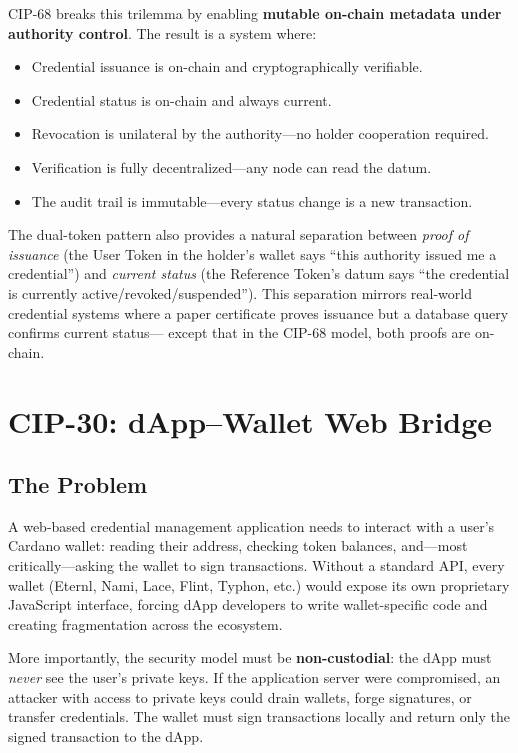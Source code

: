 CIP-68 breaks this trilemma by enabling \textbf{mutable on-chain metadata
under authority control}.  The result is a system where:

\begin{itemize}[nosep]
  \item Credential issuance is on-chain and cryptographically verifiable.
  \item Credential status is on-chain and always current.
  \item Revocation is unilateral by the authority---no holder cooperation
    required.
  \item Verification is fully decentralized---any node can read the datum.
  \item The audit trail is immutable---every status change is a new
    transaction.
\end{itemize}

The dual-token pattern also provides a natural separation between
\emph{proof of issuance} (the User Token in the holder's wallet says ``this
authority issued me a credential'') and \emph{current status} (the Reference
Token's datum says ``the credential is currently active/revoked/suspended'').
This separation mirrors real-world credential systems where a paper
certificate proves issuance but a database query confirms current status---
except that in the CIP-68 model, both proofs are on-chain.


\section{CIP-30: dApp--Wallet Web Bridge}
\label{sec:cip30}

\subsection{The Problem}

A web-based credential management application needs to interact with a
user's Cardano wallet: reading their address, checking token balances,
and---most critically---asking the wallet to sign transactions.  Without a
standard API, every wallet (Eternl, Nami, Lace, Flint, Typhon, etc.) would
expose its own proprietary JavaScript interface, forcing dApp developers to
write wallet-specific code and creating fragmentation across the ecosystem.

More importantly, the security model must be \textbf{non-custodial}: the
dApp must \emph{never} see the user's private keys.  If the application
server were compromised, an attacker with access to private keys could drain
wallets, forge signatures, or transfer credentials.  The wallet must sign
transactions locally and return only the signed transaction to the dApp.

